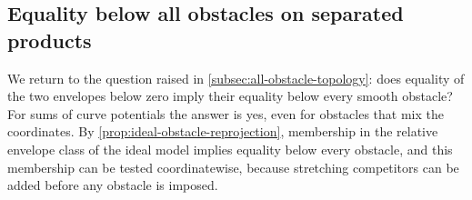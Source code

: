 \subsection{Equality below all obstacles on separated products}
\label{subsec:separated-product-all-obstacles}

We return to the question raised in \cref{subsec:all-obstacle-topology}: does equality of the two envelopes below zero imply their equality below every smooth obstacle? For sums of curve potentials the answer is yes, even for obstacles that mix the coordinates. By \cref{prop:ideal-obstacle-reprojection}, membership in the relative envelope class of the ideal model implies equality below every obstacle, and this membership can be tested coordinatewise, because stretching competitors can be added before any obstacle is imposed.

